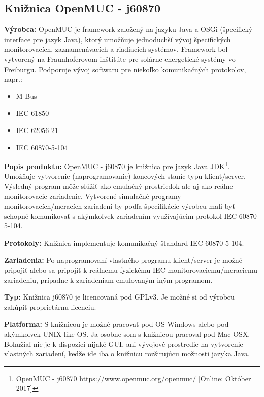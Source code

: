 \subsection{Knižnica OpenMUC - j60870}
\textbf{Výrobca:} OpenMUC je framework založený na jazyku Java a OSGi (špecifický interface pre jazyk Java), ktorý umožňuje jednoduchší vývoj špecifických monitorovacích, zaznamenávacích a riadiacich systémov. Framework bol vytvorený na Fraunhoferovom inštitúte pre solárne energetické systémy vo Freiburgu. Podporuje vývoj softwaru pre niekoľko komunikačných protokolov, napr.: \par
\begin{itemize}
\item M-Bus
\item IEC 61850 
\item IEC 62056-21
\item IEC 60870-5-104
\end{itemize} \par
\noindent \textbf{Popis produktu:} OpenMUC - j60870 je knižnica pre jazyk Java JDK\footnote{OpenMUC - j60870 \url{https://www.openmuc.org/openmuc/} [Online: Október 2017]}. Umožňuje vytvorenie (naprogramovanie) koncových staníc typu klient/server. Výsledný program môže slúžiť ako emulačný prostriedok ale aj ako reálne monitorovacie zariadenie. Vytvorené simulačné programy monitorovacích/meracích zariadení by podľa špecifikácie výrobcu mali byť schopné komunikovať s akýmkoľvek zariadením využívajúcim protokol IEC 60870-5-104. \par
\noindent \textbf{Protokoly:} Knižnica implementuje komunikačný štandard IEC 60870-5-104. \par
\noindent \textbf{Zariadenia:} Po naprogramovaní vlastného programu klient/server je možné pripojiť alebo sa pripojiť k reálnemu fyzickému IEC monitorovaciemu/meraciemu zariadeniu, prípadne k zariadeniam emulovaným iným programom. \par
\noindent \textbf{Typ:} Knižnica j60870 je licencovaná pod GPLv3. Je možné si od výrobcu zakúpiť proprietárnu licenciu. \par
\noindent \textbf{Platforma:} S knižnicou je možné pracovať pod OS Windows alebo pod akýmkoľvek UNIX-like OS. Ja osobne som s knižnicou pracoval pod Mac OSX. Bohužiaľ nie je k dispozící nijaké GUI, ani vývojové prostredie na vytvorenie vlastných zariadení, kedže ide iba o knižnicu rozširujúcu možnosti jazyka Java. \par
